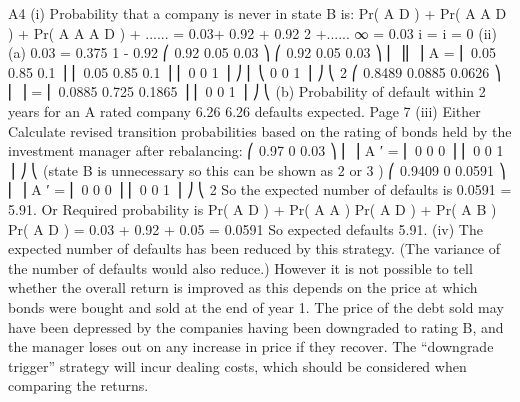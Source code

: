 \documentclass[a4paper,12pt]{article}
\begin{document}
A4
(i)
Probability that a company is never in state B is:
Pr( A \rightarrow D ) + Pr( A \rightarrow A \rightarrow D ) + Pr( A \rightarrow A \rightarrow A \rightarrow D ) + ......
= 0.03+ 0.92 + 0.92 2 +......
∞
= 0.03 \times {} i =
i = 0
(ii)
(a)
0.03
= 0.375
1 - 0.92
⎛ 0.92 0.05 0.03 ⎞ ⎛ 0.92 0.05 0.03 ⎞
⎜
⎟⎜
⎟
A = ⎜ 0.05 0.85 0.1 ⎟ ⎜ 0.05 0.85 0.1 ⎟
⎜ 0
0
1 ⎟ ⎠ ⎜ ⎝ 0
0
1 ⎟ ⎠
⎝
2
⎛ 0.8489 0.0885 0.0626 ⎞
⎜
⎟
= ⎜ 0.0885 0.725 0.1865 ⎟
⎜ 0
0
1 ⎟ ⎠
⎝
(b)
Probability of default within 2 years for an A rated company 6.26%
6.26 defaults expected.
Page 7
(iii)
Either
Calculate revised transition probabilities based on the rating of bonds held by
the investment manager after rebalancing:
⎛ 0.97 0 0.03 ⎞
⎜
⎟
A ′ = ⎜ 0
0
0 ⎟
⎜ 0
0
1 ⎟ ⎠
⎝
(state B is unnecessary so this can be shown as 2  or 3 )
⎛ 0.9409 0 0.0591 ⎞
⎜
⎟
A ′ = ⎜ 0
0
0 ⎟
⎜ 0
0
1 ⎟ ⎠
⎝
2
So the expected number of defaults is 0.0591  = 5.91.
Or
Required probability is
Pr( A \rightarrow D ) + Pr( A \rightarrow A ) \times Pr( A \rightarrow D ) + Pr( A \rightarrow B ) \times Pr( A \rightarrow D )
= 0.03 + 0.92  + 0.05  = 0.0591
So expected defaults 5.91.
(iv)
The expected number of defaults has been reduced by this strategy. (The
variance of the number of defaults would also reduce.)
However it is not possible to tell whether the overall return is improved as this
depends on the price at which bonds were bought and sold at the end of year 1.
The price of the debt sold may have been depressed by the companies having
been downgraded to rating B, and the manager loses out on any increase in
price if they recover.
The “downgrade trigger” strategy will incur dealing costs, which should be
considered when comparing the returns.
\end{document}
